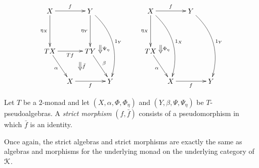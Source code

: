 \begin{Defi}
\begin{itemize}
            \[
                        \xy
            (0,0)*+{X}="00";
            (20,0)*+{Y}="10";
            (0,-20)*+{TX}="01";
            (20,-20)*+{TY}="11";
            (10,-35)*+{X}="02";
            (30,-35)*+{Y}="12";
            {\ar^{f} "00" ; "10"};
            {\ar@/^1.5pc/^{1_Y} "10" ; "12"};
            {\ar_{\eta_X} "00" ; "01"};
            {\ar_{\eta_Y} "10" ; "11"};
            {\ar_{Tf} "01" ; "11"};
            {\ar_{\alpha} "01" ; "02"};
            {\ar_{f} "02" ; "12"};
            {\ar^{\beta} "11" ; "12"};
            {\ar@{=>}^{\bar{f}} (15,-25.5) ; (15,-29.5)};
            {\ar@{=>}^{\Psi_{\eta}} (25,-17) ; (25,-21)};
            (50,0)*+{X}="30";
            (70,0)*+{Y}="40";
            (50,-20)*+{TX}="31";
            (60,-35)*+{X}="32";
            (80,-35)*+{Y}="42";
            {\ar^{f} "30" ; "40"};
            {\ar_{\eta_X} "30" ; "31"};
            {\ar_{\alpha} "31" ; "32"};
            {\ar_{f} "32" ; "42"};
            {\ar@/^1.5pc/^{1_X} "30" ; "32"};
            {\ar@/^1.5pc/^{1_Y} "40" ; "42"};
            {\ar@{=>}^{\Phi_{\eta}} (55,-17) ; (55,-21)};
        \endxy
        \]

\end{itemize}
\end{Defi}

\begin{Defi}
Let $T$ be a $2$-monad and let $(X,\alpha,\Phi,\Phi_\eta)$ and $(Y,\beta,\Psi,\Psi_\eta)$ be $T$-pseudoalgebras. A \textit{strict morphism} $(f, \bar{f})$ consists of a pseudomorphism in which $\bar{f}$ is an identity.
\end{Defi}

\begin{rem}
Once again, the strict algebras and strict morphisms are exactly the same as algebras and morphisms for the underlying monad on the underlying category of $\mathcal{K}$.
\end{rem}

